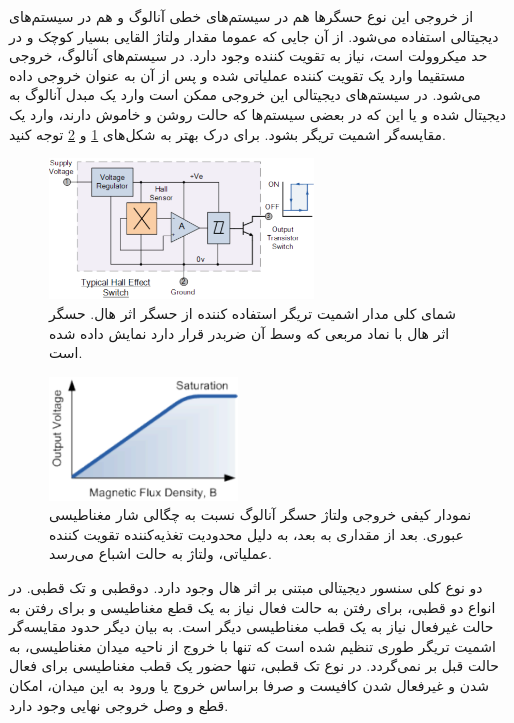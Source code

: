 \documentclass[conference]{IEEEtran-ModifiedForMVIP}
\begin{document}
از خروجی این نوع حسگر‌ها هم در سیستم‌های خطی آنالوگ و هم در سیستم‌های دیجیتالی استفاده می‌شود. از آن جایی که عموما مقدار ولتاژ القایی بسیار کوچک و در حد میکروولت است، نیاز به تقویت کننده وجود دارد. در سیستم‌های آنالوگ، خروجی مستقیما وارد یک تقویت کننده عملیاتی شده و پس از آن به عنوان خروجی داده می‌شود. در سیستم‌های دیجیتالی این خروجی ممکن است وارد یک مبدل آنالوگ به دیجیتال شده و یا این که در بعضی سیستم‌ها که حالت روشن و خاموش دارند، وارد یک مقایسه‌گر اشمیت تریگر
 بشود. برای درک بهتر به شکل‌های
 \ref{fig:2}
 و
 \ref{fig:3}
  توجه کنید.
 
 \begin{figure}[t]
 	
 	\centering 
 	\includegraphics[width=70mm]{Images/2.pdf}
 	\caption{شمای کلی مدار اشمیت تریگر استفاده کننده از حسگر اثر هال. حسگر اثر هال با نماد مربعی که وسط آن ضربدر قرار دارد نمایش داده شده است. 
 		\cite{ele_hall_2013}	
 	}\label{fig:2}
 \end{figure}

\begin{figure}[t]
	
	\centering 
	\includegraphics[width=50mm]{Images/3.pdf}
	\caption{نمودار کیفی خروجی ولتاژ حسگر آنالوگ نسبت به چگالی شار مغناطیسی عبوری. بعد از مقداری به بعد، به دلیل محدودیت تغذیه‌کننده تقویت کننده عملیاتی، ولتاژ به حالت اشباع می‌رسد.
		\cite{ele_hall_2013}	
	}\label{fig:3}
\end{figure}
 
 
دو نوع کلی سنسور دیجیتالی مبتنی بر اثر هال وجود دارد. دوقطبی و تک قطبی. در انواع دو قطبی، برای رفتن به حالت فعال نیاز به یک قطع مغناطیسی و برای رفتن به حالت غیرفعال نیاز به یک قطب مغناطیسی دیگر است. به بیان دیگر حدود مقایسه‌گر اشمیت‌ تریگر طوری تنظیم شده است که تنها با خروج از ناحیه میدان مغناطیسی، به حالت قبل بر نمی‌گردد. در نوع تک قطبی، تنها حضور یک قطب مغناطیسی برای فعال شدن و غیرفعال شدن کافیست و صرفا براساس خروج یا ورود به این میدان، امکان قطع و وصل خروجی نهایی وجود دارد.
\end{document}
